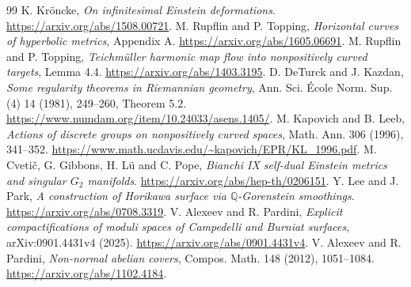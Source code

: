 \documentclass[a4paper,11pt]{article}
\numberwithin{equation}{section}
\theoremstyle{definition}
\begin{document}
\begin{thebibliography}{99}
 K. Kr\"oncke, \emph{On infinitesimal Einstein deformations}. \url{https://arxiv.org/abs/1508.00721}.
 M. Rupflin and P. Topping, \emph{Horizontal curves of hyperbolic metrics}, Appendix A. \url{https://arxiv.org/abs/1605.06691}.
 M. Rupflin and P. Topping, \emph{Teichm\"uller harmonic map flow into nonpositively curved targets}, Lemma 4.4. \url{https://arxiv.org/abs/1403.3195}.
 D. DeTurck and J. Kazdan, \emph{Some regularity theorems in Riemannian geometry}, Ann. Sci. \'Ecole Norm. Sup. (4) 14 (1981), 249--260, Theorem 5.2. \url{https://www.numdam.org/item/10.24033/asens.1405/}.
 M. Kapovich and B. Leeb, \emph{Actions of discrete groups on nonpositively curved spaces}, Math. Ann. 306 (1996), 341--352. \url{https://www.math.ucdavis.edu/~kapovich/EPR/KL_1996.pdf}.
 M. Cveti\v c, G. Gibbons, H. L\"u and C. Pope, \emph{Bianchi IX self-dual Einstein metrics and singular $G_2$ manifolds}. \url{https://arxiv.org/abs/hep-th/0206151}.
 Y. Lee and J. Park, \emph{A construction of Horikawa surface via $\mathbb Q$-Gorenstein smoothings}. \url{https://arxiv.org/abs/0708.3319}.
 V. Alexeev and R. Pardini, \emph{Explicit compactifications of moduli spaces of Campedelli and Burniat surfaces}, arXiv:0901.4431v4 (2025). \url{https://arxiv.org/abs/0901.4431v4}.
 V. Alexeev and R. Pardini, \emph{Non-normal abelian covers}, Compos. Math. 148 (2012), 1051--1084. \url{https://arxiv.org/abs/1102.4184}.
\end{thebibliography}
\end{document}
